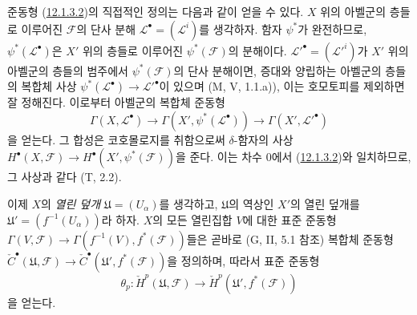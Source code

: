 \begin{env}[12.1.4]
\label{0.12.1.4-fr}
준동형 (\hyperref[0.12.1.3.2-fr]{12.1.3.2})의 직접적인 정의는 다음과
같이 얻을 수 있다. $X$ 위의 아벨군의 층들로 이루어진 $\mathcal F$의
단사 분해 $\mathcal L^\bullet=(\mathcal L^i)$를 생각하자. 함자
$\psi^*$가 완전하므로, $\psi^*(\mathcal L^\bullet)$은 $X'$ 위의 층들로
이루어진 $\psi^*(\mathcal F)$의 분해이다. $\mathcal L'^\bullet=
(\mathcal L'^i)$가 $X'$ 위의 아벨군의 층들의 범주에서
$\psi^*(\mathcal F)$의 단사 분해이면, 증대와 양립하는 아벨군의
층들의 복합체 사상
$\psi^*(\mathcal L^\bullet)\to\mathcal L'^\bullet$이 있으며
(M, V, 1.1.a)), 이는 호모토피를 제외하면 잘 정해진다. 이로부터
아벨군의 복합체 준동형
\[
\Gamma(X,\mathcal L^\bullet)\longrightarrow
\Gamma(X',\psi^*(\mathcal L^\bullet))\longrightarrow
\Gamma(X',\mathcal L'^\bullet)
\]
을 얻는다. 그 합성은 코호몰로지를 취함으로써 $\delta$-함자의 사상
$H^\bullet(X,\mathcal F)\to H^\bullet(X',\psi^*(\mathcal F))$을 준다.
이는 차수 0에서 (\hyperref[0.12.1.3.2-fr]{12.1.3.2})와 일치하므로,
그 사상과 같다 (T, 2.2).

이제 $X$의 \emph{열린 덮개} $\mathfrak U=(U_\alpha)$를 생각하고,
$\mathfrak U$의 역상인 $X'$의 열린 덮개를
$\mathfrak U'=(f^{-1}(U_\alpha))$라 하자. $X$의 모든 열린집합 $V$에
대한 표준 준동형
$\Gamma(V,\mathcal F)\to\Gamma(f^{-1}(V),f^*(\mathcal F))$들은
곧바로 (G, II, 5.1 참조) 복합체 준동형
$\check C^\bullet(\mathfrak U,\mathcal F)\to
\check C^\bullet(\mathfrak U',f^*(\mathcal F))$을 정의하며, 따라서
표준 준동형
\[
\label{0.12.1.4.1-fr}
\tag{12.1.4.1}
\theta_p:\check H^p(\mathfrak U,\mathcal F)
\longrightarrow\check H^p(\mathfrak U',f^*(\mathcal F))
\]
을 얻는다.


\end{env}
